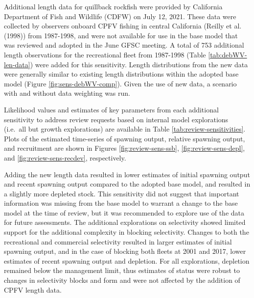 \documentclass[11pt,
  english,
  a4paper,
]{article}
\begin{document}
Additional length data for quillback rockfish were provided by California Department of Fish and Wildlife (CDFW) on July 12, 2021. These data were collected by observers onboard CPFV fishing in central California ({Reilly et al. (1998)\leavevmode\tagmcend\tagstructend}) from 1987-1998, and were not available for use in the base model that was reviewed and adopted in the June GFSC meeting. A total of 753 additional length observations for the recreational fleet from 1987-1998 (Table \ref{tab:debWV-len-data}) were added for this sensitivity. Length distributions from the new data were generally similar to existing length distributions within the adopted base model (Figure \ref{fig:sens-debWV-comp}). Given the use of new data, a scenario with and without data weighting was run.

\leavevmode\tagmcend\tagstructend\par


Likelihood values and estimates of key parameters from each additional sensitivity to address review requests based on internal model explorations (i.e.~all but growth explorations) are available in Table \ref{tab:review-sensitivities}. Plots of the estimated time-series of spawning output, relative spawning output, and recruitment are shown in Figures \ref{fig:review-sens-ssb}, \ref{fig:review-sens-depl}, and \ref{fig:review-sens-recdev}, respectively.

\leavevmode\tagmcend\tagstructend\par


Adding the new length data resulted in lower estimates of initial spawning output and recent spawning output compared to the adopted base model, and resulted in a slightly more depleted stock. This sensitivity did not suggest that important information was missing from the base model to warrant a change to the base model at the time of review, but it was recommended to explore use of the data for future assessments. The additional explorations on selectivity showed limited support for the additional complexity in blocking selectivity. Changes to both the recreational and commercial selectivity resulted in larger estimates of initial spawning output, and in the case of blocking both fleets at 2001 and 2017, lower estimates of recent spawning output and depletion. For all explorations, depletion remained below the management limit, thus estimates of status were robust to changes in selectivity blocks and form and were not affected by the addition of CPFV length data.
\end{document}
